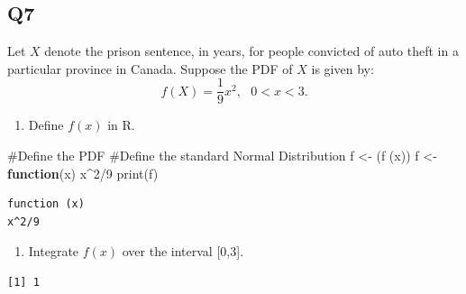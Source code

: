 \documentclass[
]{article}
\newenvironment{Shaded}{\begin{snugshade}}{\end{snugshade}}
\newcommand{\CommentTok}[1]{\textcolor[rgb]{0.37,0.37,0.37}{#1}}
\newcommand{\ControlFlowTok}[1]{\textcolor[rgb]{0.00,0.23,0.31}{\textbf{#1}}}
\newcommand{\DecValTok}[1]{\textcolor[rgb]{0.68,0.00,0.00}{#1}}
\newcommand{\FunctionTok}[1]{\textcolor[rgb]{0.28,0.35,0.67}{#1}}
\newcommand{\NormalTok}[1]{\textcolor[rgb]{0.00,0.23,0.31}{#1}}
\newcommand{\OtherTok}[1]{\textcolor[rgb]{0.00,0.23,0.31}{#1}}
\newcommand{\SpecialCharTok}[1]{\textcolor[rgb]{0.37,0.37,0.37}{#1}}
\providecommand{\tightlist}{%
  \setlength{\itemsep}{0pt}\setlength{\parskip}{0pt}}
\begin{document}
\subsection{Q7}\label{q7}

Let \(X\) denote the prison sentence, in years, for people convicted of
auto theft in a particular province in Canada. Suppose the PDF of \(X\)
is given by: \[f(X)=\frac{1}{9}x^2,\text{ }0<x<3.\]

\begin{enumerate}
\def\labelenumi{(\alph{enumi})}
\tightlist
\item
  Define \(f(x)\) in R.
\end{enumerate}

\begin{tcolorbox}[enhanced jigsaw, arc=.35mm, bottomrule=.15mm, breakable, colback=white, colframe=quarto-callout-tip-color-frame, left=2mm, leftrule=.75mm, opacityback=0, rightrule=.15mm, toprule=.15mm]

\begin{Shaded}
\begin{Highlighting}[]
\CommentTok{\#Define the PDF}
\CommentTok{\#Define the standard Normal Distribution}
\NormalTok{f }\OtherTok{\textless{}{-}}\NormalTok{ (}\FunctionTok{f}\NormalTok{ (x))}
\NormalTok{f }\OtherTok{\textless{}{-}} \ControlFlowTok{function}\NormalTok{(x)}
\NormalTok{  x}\SpecialCharTok{\^{}}\DecValTok{2}\SpecialCharTok{/}\DecValTok{9}
\FunctionTok{print}\NormalTok{(f)}
\end{Highlighting}
\end{Shaded}

\begin{verbatim}
function (x) 
x^2/9
\end{verbatim}

\end{tcolorbox}

\begin{enumerate}
\def\labelenumi{(\alph{enumi})}
\setcounter{enumi}{1}
\tightlist
\item
  Integrate \(f(x)\) over the interval {[}0,3{]}.
\end{enumerate}

\begin{tcolorbox}[enhanced jigsaw, arc=.35mm, bottomrule=.15mm, breakable, colback=white, colframe=quarto-callout-tip-color-frame, left=2mm, leftrule=.75mm, opacityback=0, rightrule=.15mm, toprule=.15mm]

\begin{Shaded}
\end{Shaded}

\begin{verbatim}
[1] 1
\end{verbatim}

\end{tcolorbox}
\end{document}
